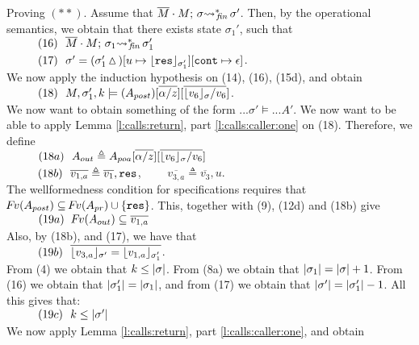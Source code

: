 \begin{description}

 \vspace{.3cm}
Proving $(**)$. Assume that   $\leadstoBoundedStarFin  {\Mtwo\cdot M}  {\sigma}  {\sigma'}$. Then, by the operational semantics, we obtain that 
there exists state $\sigma_1'$, such that \\
$\SPS (16) \ \ \leadstoBoundedStarFin  {\Mtwo\cdot M}  {\sigma_1}  {\sigma_1'}$ \\
$\SPS (17) \ \ \sigma'=(\sigma_1'\popSymbol)[u \mapsto {\interpret {\sigma_1'} {\prg{res}}}][\prg{cont}\mapsto \epsilon]$.
\\
We now apply the induction hypothesis on (14), (16), (15d), and obtain
\\ 
$\SPS (18) \ \  \satDAssertFrom M  {\sigma_1'} {k}   {(A_{post})[\overline{\alpha/z}][\overline{\interpret {\sigma} {v_6} /v_6}]}$.
\\
We now want to obtain something of the form $...\sigma' \models ...A'$. We now want to be able to apply   Lemma \ref{l:calls:return},  part \ref{l:calls:caller:one} on (18). Therefore, we  define
\\
$\SPS (18a) \ \  \Aout \triangleq  \Apoa[\overline{\alpha/z}][\overline{\interpret {\sigma} {v_6} /v_6}]$
\\
$\SPS (18b) \ \  \overline {v_{1,a}} \triangleq  \overline {v_1}, \prg{res}$,   \ \ \ \ 
$\overline {v_{3,a}} \triangleq  \overline {v_3}, u$.
\\
The wellformedness condition for specifications requires that $\fv (A_{post}) \subseteq  \fv (\Apr) \cup \{ \prg{res} \}$. 
This, together with  (9), (12d) and (18b) give  \\
$\SPS (19a) \ \  \fv(\Aout) \subseteq  \overline {v_{1,a}}$
\\
Also, by (18b), and (17), we have that   
\\
$\SPS (19b) \ \ \overline {\interpret {\sigma'} {v_{3,a}}  =  \interpret {\sigma_1'} {v_{1,a}} }$.
\\
From (4) we obtain that  $ k \leq \DepthSt {\sigma}$. From  (8a) we obtain that $ \DepthSt {\sigma_1} = \DepthSt {\sigma} +1$. From (16) we obtain that  $ \DepthSt {\sigma_1'} = \DepthSt {\sigma_1}$, and from (17) we obtain that $ \DepthSt {\sigma'} = \DepthSt {\sigma_1'} -1$. All this gives that:\\
$\SPS (19c) \ \ k \leq \DepthSt {\sigma'}$
\\
We now apply  Lemma \ref{l:calls:return},  part \ref{l:calls:caller:one}, and obtain  
\\

\end{description}
